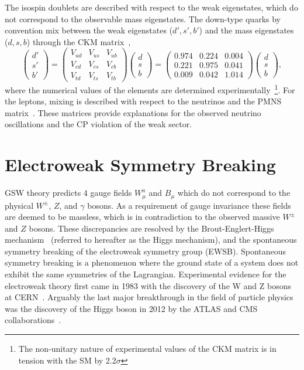 The isospin doublets are described with respect to the weak eigenstates, which do not correspond to the observable mass eigenstates.
The down-type quarks by convention mix between the weak eigenstates ($d', s', b'$) and the mass eigenstates ($d, s, b$) through the CKM matrix~\cite{cabibbo1963},
\begin{equation}
    \label{eq:ckm_matrix}
    \begin{pmatrix} d' \\ s' \\ b' \end{pmatrix} =
    \begin{pmatrix} V_{ud} & V_{us} & V_{ub} \\ V_{cd} & V_{cs} & V_{cb} \\ V_{td} & V_{ts} & V_{tb} \end{pmatrix} \begin{pmatrix} d \\ s \\ b \end{pmatrix} =
    \begin{pmatrix} 0.974 & 0.224 & 0.004 \\ 0.221 & 0.975 & 0.041 \\ 0.009 & 0.042 & 1.014 \end{pmatrix} \begin{pmatrix} d \\ s \\ b \end{pmatrix},
\end{equation}
where the numerical values of the elements are determined experimentally~\cite{ParticleDataGroup}\footnote{The non-unitary nature of experimental values of the CKM matrix is in tension with the SM by 2.2$\sigma$}.
For the leptons, mixing is described with respect to the neutrinos and the PMNS matrix~\cite{PMNSMatrix}.
These matrices provide explanations for the observed neutrino oscillations and the CP violation of the weak sector.

\section{Electroweak Symmetry Breaking}
\label{sec:higgs}

GSW theory predicts 4 gauge fields $W^a_\mu$ and $B_\mu$ which do not correspond to the physical $W^\pm$, $Z$, and $\gamma$ bosons.
As a requirement of gauge invariance these fields are deemed to be massless, which is in contradiction to the observed massive $W^\pm$ and $Z$ bosons.
These discrepancies are resolved by the Brout-Englert-Higgs mechanism~\cite{Higgs1, Higgs2, Higgs3} (referred to hereafter as the Higgs mechanism), and the spontaneous symmetry breaking of the electroweak symmetry group (EWSB).
Spontaneous symmetry breaking is a phenomenon where the ground state of a system does not exhibit the same symmetries of the Lagrangian.
Experimental evidence for the electroweak theory first came in 1983 with the discovery of the W and Z bosons at CERN\@~\cite{WZ}.
Arguably the last major breakthrough in the field of particle physics was the discovery of the Higgs boson in 2012 by the ATLAS and CMS collaborations~\cite{ATLASHiggs, CMSHiggs}.

